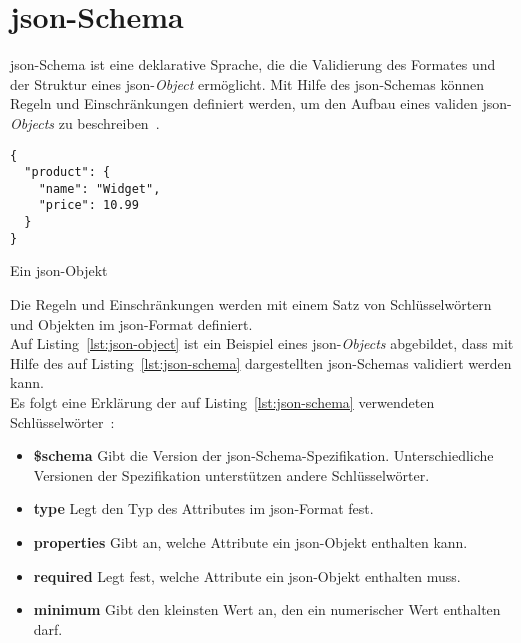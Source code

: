 \section{\acs{json}-Schema}\label{sec:json-schema}

\acs{json}-Schema ist eine deklarative Sprache, die die Validierung des Formates und der Struktur eines \ac{json}-\textit{Object} ermöglicht.
Mit Hilfe des \acs{json}-Schemas können Regeln und Einschränkungen definiert werden, um den Aufbau eines validen \ac{json}-\textit{Objects} zu beschreiben~\cite{json-schema-description}.

\begin{listing}[htp]
      \begin{verbatim}
{
  "product": {
    "name": "Widget",
    "price": 10.99
  }
}
      \end{verbatim}
      \caption{Ein \acs{json}-Objekt}
      \label{lst:json-object}
\end{listing}

Die Regeln und Einschränkungen werden mit einem Satz von Schlüsselwörtern und Objekten im \acs{json}-Format definiert.
\\
Auf Listing~\ref{lst:json-object} ist ein Beispiel eines \acs{json}-\textit{Objects} abgebildet, dass mit Hilfe des auf Listing~\ref{lst:json-schema}
dargestellten \acs{json}-Schemas validiert werden kann.
\\
Es folgt eine Erklärung der auf Listing~\ref{lst:json-schema} verwendeten Schlüsselwörter~\cite{json-schema-creation}:

\begin{itemize}
      \setlength\itemsep{-0.5cm}
      \item
            \textbf{\$schema} Gibt die Version der \acs{json}-Schema-Spezifikation. Unterschiedliche Versionen der Spezifikation
            unterstützen andere Schlüsselwörter.
      \item
            \textbf{type} Legt den Typ des Attributes im \acs{json}-Format fest.
      \item
            \textbf{properties} Gibt an, welche Attribute ein \acs{json}-Objekt enthalten kann.
      \item
            \textbf{required} Legt fest, welche Attribute ein \acs{json}-Objekt enthalten muss.
      \item
            \textbf{minimum} Gibt den kleinsten Wert an, den ein numerischer Wert enthalten darf.
\end{itemize}

